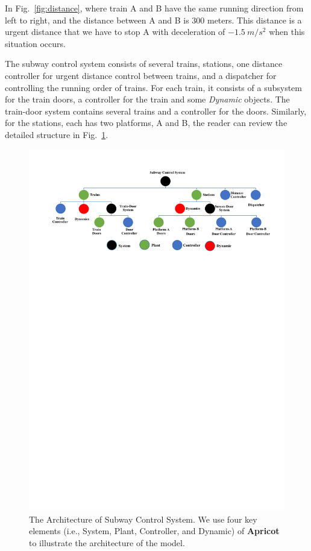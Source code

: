 \documentclass{WileySix}
\newcommand{\apricot}{\bfseries Apricot}
\begin{document}
In Fig.~\ref{fig:distance}, where train A and B have the same running direction from left to right, and the distance between A and B is 300 meters.
This distance is a urgent distance that we have to stop A with deceleration of $-1.5~m/s^2$ when this situation occurs.

The subway control system consists of several trains, stations, one distance controller for urgent distance control between trains, and a dispatcher for controlling the running order of trains.
For each train, it consists of a subsystem for the train doors, a controller for the train and some {\em Dynamic} objects. The train-door system contains several trains and a controller for the doors. Similarly, for the stations, each has two platforms, A and B, the reader can review the detailed structure in Fig.~\ref{fig:systemstructure}.



\begin{figure}
\centering
\includegraphics[width=1\linewidth]{./figs/systemstructure}
\caption[The Architecture of Subway Control System]{The Architecture of Subway Control System.
We use four key elements (i.e., System, Plant, Controller, and Dynamic) of {\apricot} to illustrate the architecture of the model.}
\label{fig:systemstructure}
\end{figure}
\end{document}
